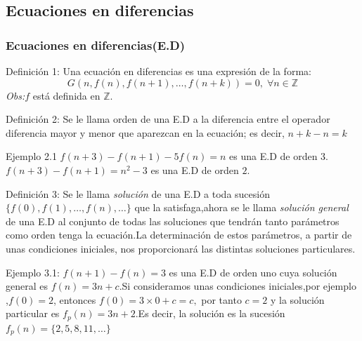 \documentclass[spanish, utf8,handout]{beamer} %
\theoremstyle{definition}
\begin{document}
\subsection{Ecuaciones en diferencias}
\begin{frame}
	\frametitle{Ecuaciones en diferencias(E.D)}
	\begin{block}{Definición 1:}
	Una ecuación en diferencias es una expresión de la forma:
	$$
	G(n,f(n),f(n+1),\ldots,f(n+k))=0, \; \forall n \in \mathbb{Z}
	$$
	\emph{Obs:}\hspace{2mm}$ f $ está definida en $ \mathbb{Z} .$
	\end{block}
	\begin{block}{Definición 2:}
	Se le llama orden de una E.D a la diferencia entre el operador diferencia mayor y menor que aparezcan en la ecuación; es decir, $ n+k-n=k $
	\end{block}
\begin{block}{Ejemplo 2.1}
	$ f(n+3)-f(n+1)-5f(n)=n $ es una E.D de orden $ 3 .$\\$ f(n+3)-f(n+1)=n^{2}-3 $ es una E.D de orden $ 2 .$
\end{block}
\end{frame}
\begin{frame}
\begin{block}{Definición 3:}
	Se le llama \emph{solución} de una E.D a toda sucesión $  \{f(0),f(1),\ldots,f(n),\ldots \} $ que la satisfaga,ahora se le llama \emph{solución general} de una E.D al conjunto de todas las soluciones que tendrán tanto parámetros como orden tenga la ecuación.La determinación de estos parámetros, a partir de unas
	condiciones iniciales, nos proporcionará las distintas soluciones particulares.
\end{block}
\begin{block}{Ejemplo 3.1:}
	$ f(n+1)-f(n)=3 $ es una E.D de orden uno cuya solución general es $ f(n)=3n+c $.Si consideramos unas condiciones iniciales,por ejemplo ,$ f(0)=2$, entonces $ f(0)=3\times0+c=c,$ por tanto $ c=2 $ y la solución particular es $ f_{p}(n)=3n+2.$Es decir, la solución es la sucesión $ f_{p}(n)=\{2,5,8,11,\ldots\} $
\end{block}
\end{frame}
\end{document}
